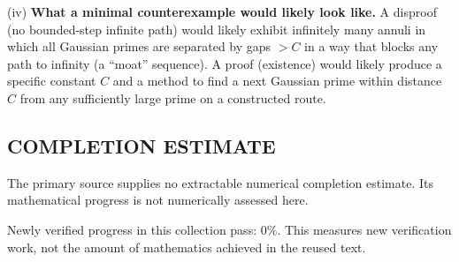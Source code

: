(iv) \textbf{What a minimal counterexample would likely look like.}
A disproof (no bounded-step infinite path) would likely exhibit infinitely many annuli in which all Gaussian primes are separated by gaps $>C$ in a way that blocks any path to infinity (a ``moat'' sequence). A proof (existence) would likely produce a specific constant $C$ and a method to find a next Gaussian prime within distance $C$ from any sufficiently large prime on a constructed route.




\subsection*{COMPLETION ESTIMATE}
The primary source supplies no extractable numerical completion estimate. Its mathematical progress is not numerically assessed here.

Newly verified progress in this collection pass: $0\%$. This measures new verification work, not the amount of mathematics achieved in the reused text.
